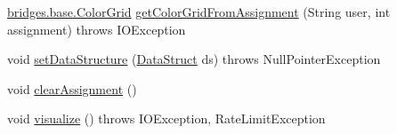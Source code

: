 \begin{DoxyCompactItemize}
\item 
\hyperlink{classbridges_1_1base_1_1_color_grid}{bridges.\+base.\+Color\+Grid} \hyperlink{classbridges_1_1connect_1_1_bridges_a83e50f477ac993d2fb8c2449544b6f57}{get\+Color\+Grid\+From\+Assignment} (String user, int assignment)  throws I\+O\+Exception 
\item 
void \hyperlink{classbridges_1_1connect_1_1_bridges_a921a6603b2445b1abe30a1b3d6f0c255}{set\+Data\+Structure} (\hyperlink{classbridges_1_1base_1_1_data_struct}{Data\+Struct} ds)  throws Null\+Pointer\+Exception 
\item 
void \hyperlink{classbridges_1_1connect_1_1_bridges_ad79081ca241e5bcb77b1ed52a09fdd39}{clear\+Assignment} ()
\item 
void \hyperlink{classbridges_1_1connect_1_1_bridges_a1853d64ffb8675ba2ec227a2b819cd24}{visualize} ()  throws I\+O\+Exception, Rate\+Limit\+Exception 
\end{DoxyCompactItemize}
